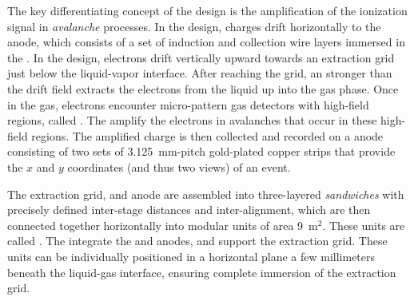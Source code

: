 The key differentiating concept of the \dual design is the amplification of the ionization signal in \textit{avalanche} processes. In the \single design, charges drift horizontally to the anode, which consists of a set of induction and collection wire layers immersed in the \lar. In the \dual design, electrons drift vertically upward towards an extraction grid just below the liquid-vapor interface. After reaching the grid, an \efield stronger than the drift field extracts the electrons from the liquid up into the gas phase. Once in the gas, electrons encounter micro-pattern gas detectors with high-field regions, called . The  amplify the electrons in avalanches that occur in these high-field regions. %
The amplified charge is then collected and recorded on a \twod anode
consisting of two sets of \SI{3.125}{mm}-pitch gold-plated copper strips that provide the $x$
and $y$ coordinates (and thus two views) of an event.



The extraction grid,  and anode are assembled into three-layered \textit{sandwiches} 
with precisely defined inter-stage distances and inter-alignment,  which are then connected together horizontally into
modular units of area \num{9}~m$^2$. These units are called .
The  integrate the  and anodes, and support the extraction grid. These units can be individually positioned in a horizontal plane a few millimeters beneath the liquid-gas interface, ensuring complete immersion of the extraction grid.


